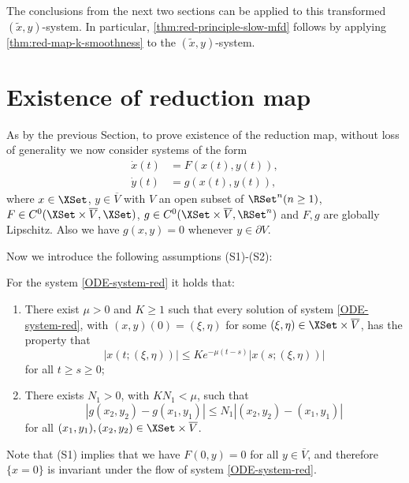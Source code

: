 \documentclass[a4paper]{siamart190516}
\begin{document}
The conclusions from the next two sections can be applied to this transformed $(\tilde{x},y)$-system. In particular, 
\cref{thm:red-principle-slow-mfd} follows by applying \cref{thm:red-map-k-smoothness}  to the $(\tilde{x},y)$-system. 
 
 

 
 \section{Existence of reduction map}\label{sec:red-map-existence}
 
 As by the previous Section, to prove existence of the reduction map, without loss of generality we now consider systems of the form
 \begin{equation}\label{ODE-system-red}
 \begin{aligned}
 \dot{x}(t) &= F(x(t),y(t)), \\
 \dot{y}(t) &= g(x(t),y(t)),
 \end{aligned}
 \end{equation}
 where $x \in \XSet$, $y \in \overline{V}$ with $V$ an open subset of $\RSet^n  (n \geq 1)$, $F \in C^0(\XSet \times \overline{V},\XSet)$, $g \in C^0(\XSet\times \overline{V}, \RSet^n)$ and $F,g$ are globally Lipschitz. Also we have $g(x,y)=0$ whenever $y \in \partial V$.
 
Now we introduce the following assumptions (S1)-(S2):
  \begin{hypothesis}\label{hyp:ODE-system-red}
For the system \cref{ODE-system-red} it holds that:
 \begin{enumerate}
 \item[$\mathrm{(S1)}$] There exist $\mu >0$ and $K \geq 1$ such that every solution of system \cref{ODE-system-red}, with $(x,y)(0) = (\xi,\eta)$ for some $(\xi,\eta) \in \XSet \times \overline{V}$, has the property that 
\begin{equation}\label{eq:process-exp-bdd-red}
  |x(t;(\xi,\eta)) | \leq K e^{-\mu (t-s)} |x(s;(\xi,\eta))|
\end{equation}
for all $t \geq s \geq 0$;
 \item[$\mathrm{(S2)}$]  There exists $N_1 > 0$, with $K N_1 < \mu $, such that
 \[
 | g(x_2,y_2) - g(x_1,y_1) | \leq N_1 |(x_2,y_2) - (x_1,y_1)|
 \]
 for all $(x_1,y_1), (x_2,y_2) \in \XSet \times \overline{V}$.
 \end{enumerate}
 \end{hypothesis}
Note that (S1) implies that we have $F(0,y) = 0 $ for all $y \in \overline{V}$, and therefore $\{ x = 0 \}$ is invariant under the flow of system \cref{ODE-system-red}.
\end{document}
